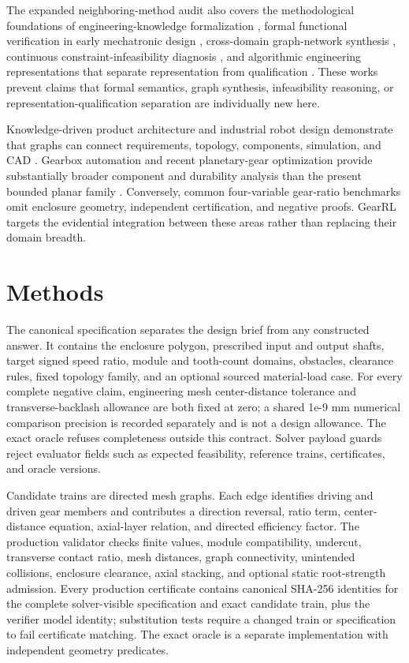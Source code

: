 \documentclass[preprint,12pt]{elsarticle}
\begin{document}
The expanded neighboring-method audit also covers the methodological foundations of engineering-knowledge formalization \cite{sacks-2020}, formal functional verification in early mechatronic design \cite{wang-2023-formal}, cross-domain graph-network synthesis \cite{shai-2008}, continuous constraint-infeasibility diagnosis \cite{khorshid-2018}, and algorithmic engineering representations that separate representation from qualification \cite{pandey-2025}. These works prevent claims that formal semantics, graph synthesis, infeasibility reasoning, or representation-qualification separation are individually new here.

Knowledge-driven product architecture and industrial robot design demonstrate that graphs can connect requirements, topology, components, simulation, and CAD \cite{huang-2025,sun-2026}. Gearbox automation and recent planetary-gear optimization provide substantially broader component and durability analysis than the present bounded planar family \cite{fuerst-2021,kim-2026}. Conversely, common four-variable gear-ratio benchmarks omit enclosure geometry, independent certification, and negative proofs. GearRL targets the evidential integration between these areas rather than replacing their domain breadth.

\section{Methods}
The canonical specification separates the design brief from any constructed answer. It contains the enclosure polygon, prescribed input and output shafts, target signed speed ratio, module and tooth-count domains, obstacles, clearance rules, fixed topology family, and an optional sourced material-load case. For every complete negative claim, engineering mesh center-distance tolerance and transverse-backlash allowance are both fixed at zero; a shared 1e-9 mm numerical comparison precision is recorded separately and is not a design allowance. The exact oracle refuses completeness outside this contract. Solver payload guards reject evaluator fields such as expected feasibility, reference trains, certificates, and oracle versions.

Candidate trains are directed mesh graphs. Each edge identifies driving and driven gear members and contributes a direction reversal, ratio term, center-distance equation, axial-layer relation, and directed efficiency factor. The production validator checks finite values, module compatibility, undercut, transverse contact ratio, mesh distances, graph connectivity, unintended collisions, enclosure clearance, axial stacking, and optional static root-strength admission. Every production certificate contains canonical SHA-256 identities for the complete solver-visible specification and exact candidate train, plus the verifier model identity; substitution tests require a changed train or specification to fail certificate matching. The exact oracle is a separate implementation with independent geometry predicates.
\end{document}
